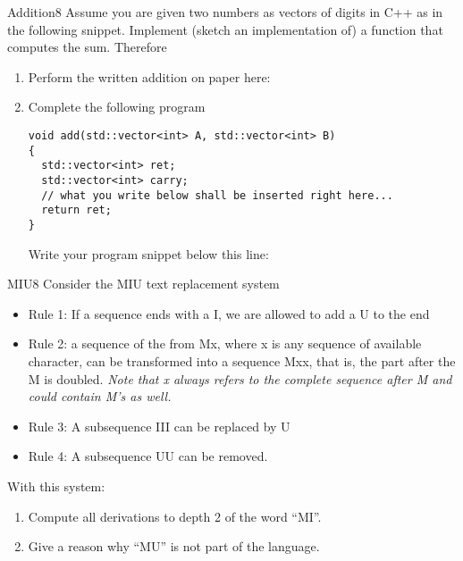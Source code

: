 \documentclass[twoside]{article}
\begin{document}
\clearpage
\begin{task}{Addition}{8}{}
  Assume you are given two numbers as vectors of digits in C++ as in the following snippet. Implement (sketch an implementation of) a function that computes the sum. Therefore

  \begin{enumerate}
  \item{Perform the written addition on paper here: \vspace{6cm}}


  \item{Complete the following program}

\begin{lstlisting}
void add(std::vector<int> A, std::vector<int> B)
{
  std::vector<int> ret;
  std::vector<int> carry;
  // what you write below shall be inserted right here...
  return ret;
}  
\end{lstlisting}

Write your program snippet below this line:
\vspace*{6cm}



    \end{enumerate}

  

\end{task}


\clearpage
\begin{task}{MIU}{8}{}
  Consider the MIU text replacement system

\begin{itemize}
\item
  Rule 1: If a sequence ends with a I, we are allowed to add a U to the
  end
\item
  Rule 2: a sequence of the from Mx, where x is any sequence of
  available character, can be transformed into a sequence Mxx, that is,
  the part after the M is doubled. \emph{Note that x always refers to
  the complete sequence after M and could contain M's as well.}
\item
  Rule 3: A subsequence III can be replaced by U
\item
  Rule 4: A subsequence UU can be removed.
\end{itemize}


With this system:
\begin{enumerate}
  \item{Compute all derivations to depth 2 of the word ``MI''. \vspace{8cm}}
  \item{Give a reason why ``MU'' is not part of the language. \vspace{2cm}}
\end{enumerate}
\end{task}
\end{document}
